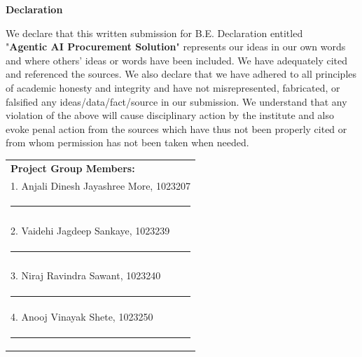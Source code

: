 
\begin{centering}
\large
{\LARGE\bf Declaration}\\
\end{centering}

\justify
We declare that this written submission for B.E. Declaration entitled \\
"{\bf Agentic AI Procurement Solution}" represents our ideas in our own words and where others' ideas or words have been included. We have adequately cited and referenced the sources. We also declare that we have adhered to all principles of academic honesty and integrity and have not misrepresented, fabricated, or falsified any ideas/data/fact/source in our submission. We understand that any violation of the above will cause disciplinary action by the institute and also evoke penal action from the sources which have thus not been properly cited or from whom permission has not been taken when needed.  \\ 

\vspace{3cm}
\hfill%
\begin{tabular}[t]{l@{}}
\vspace{1cm}

{\textbf{Project Group Members:}} \\ 
\vspace{1cm}

1. Anjali Dinesh Jayashree More, 1023207 \\
\noindent\rule{5cm}{0.10pt} \\
\\
\vspace{1cm}

2. Vaidehi Jagdeep Sankaye, 1023239 \\
\noindent\rule{5cm}{0.10pt} \\
\\
\vspace{1cm}

3. Niraj Ravindra Sawant, 1023240 \\
 \noindent\rule{5cm}{0.10pt}
\\
\vspace{1cm}


4. Anooj Vinayak Shete, 1023250 \\
 \noindent\rule{5cm}{0.10pt}

\end{tabular}


